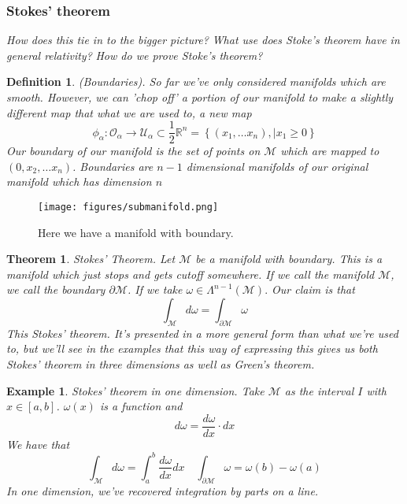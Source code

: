 \documentclass[11pt, a4paper]{article}   	%
\theoremstyle{slplain}
\newtheorem*{thm}{Theorem}
\newtheorem*{example}{Example}
\newtheorem*{defn}{Definition}
\begin{document}
\subsubsection{Stokes' theorem}
\begin{questions}
\textit{How does this tie in to the bigger picture? }  
\textit{What use does Stoke's theorem have in general relativity?} 
\textit{How do we prove Stoke's theorem?} 
\end{questions}

\begin{defn}{(Boundaries).} 
So far we've only considered manifolds which are smooth. 
However, we can 'chop off' a portion of 
our manifold to make a slightly different map that what we 
are used to, a new map 
\[
\phi_\alpha : \mathcal{ O }_\alpha \to \mathcal{ U }_\alpha \subset \frac{1}{2 } \mathbb{R}^n  = 
\left\{ (x_1, \dots x_ n ), \mid x_1 \geq 0  \right\} 
\] Our boundary of our manifold is the
set of points on $ \mathcal{ M }  $ which are mapped to 
$ ( 0 , x_2 , \dots x_ n ) $. 
Boundaries are $ n - 1 $ dimensional manifolds 
of our original manifold which has dimension $n$

\end{defn}

\begin{figure}[h]
	\centering
	\texttt{[image: figures/submanifold.png]}
	\caption{Here we have a manifold with boundary.}%
\end{figure}

\begin{thm}{Stokes' Theorem.}
Let $ \mathcal{ M } $ be a manifold with boundary. 
This is a manifold which just stops and gets cutoff somewhere. 
If we call the manifold $ \mathcal{ M } $, we call the boundary 
$ \partial  \mathcal{ M }$. 
If we take $ \omega  \in \Lambda^{ n - 1} ( \mathcal{ M } ). $
Our claim is that
\[
\int_{ \mathcal{ M } } d \omega = \int_{ \partial  \mathcal{ M }} \omega
\] This Stokes' theorem. It's 
presented in a more general form 
than what we're used to, but we'll see in the 
examples that this way of expressing this 
gives us both Stokes' theorem in three dimensions 
as well as Green's theorem. 

\end{thm}

\begin{example}{Stokes' theorem in one dimension. } 
Take $ \mathcal{ M } $ as the interval $ I $ with $ x \in [ a, b ] $. 
$ \omega ( x)  $ is a function and 
\[
d \omega = \frac{ d \omega }{ dx  } \cdot  dx
\] We have that 
\[
\int_{ \mathcal{ M } } d \omega = \int_a^ b \frac{ d \omega }{ dx } dx \quad \int_{ \partial  \mathcal{ M } } \omega = \omega( b ) - \omega ( a) 
\] In one dimension, we've
recovered integration by 
parts on a line. 

\end{example}
\end{document}
